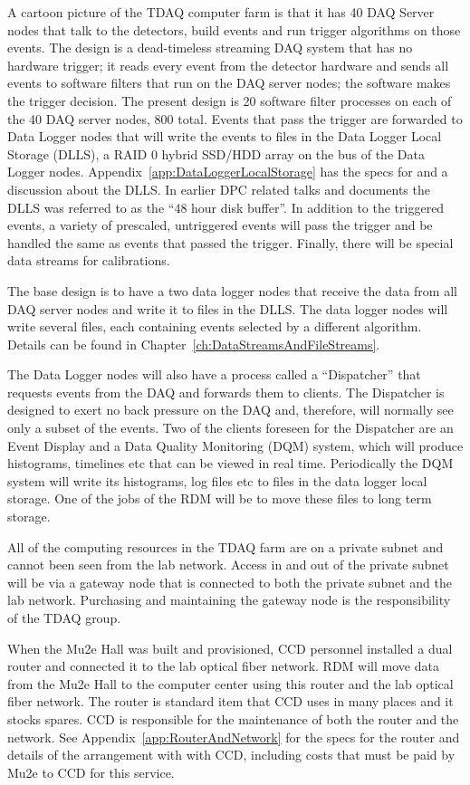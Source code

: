 A cartoon picture of the TDAQ computer farm is that it has 40 DAQ Server nodes
that talk to the detectors, build events and run trigger algorithms on those events.
The design is a dead-timeless streaming DAQ system that has no hardware trigger;
it reads every event from the detector hardware and sends all events to software filters
that run on the DAQ server nodes;
the software makes the trigger decision.
The present design is 20 software filter processes on each of the 40 DAQ server nodes, 800 total.
Events that pass the trigger are forwarded to Data Logger nodes that will write the events
to files in the Data Logger Local Storage (DLLS), a RAID 0 hybrid SSD/HDD array on the bus of the Data Logger nodes.
Appendix~\ref{app:DataLoggerLocalStorage} has the specs for and a discussion about the DLLS.
In earlier DPC related talks and documents the DLLS  was referred to as the ``48 hour disk buffer''.
In addition to the triggered events, a variety of prescaled, untriggered events will pass the
trigger and be handled the same as events that passed the trigger.
Finally, there will be special data streams for calibrations.

The base design is to have a two data logger nodes that receive the data from all DAQ server nodes
and write it to files in the DLLS.
The data logger nodes will write several files, each containing events selected by a different algorithm.
Details can be found in Chapter~\ref{ch:DataStreamsAndFileStreams}.

The Data Logger nodes will also have a process called a ``Dispatcher''
that requests events from the DAQ and forwards them to clients.
The Dispatcher is designed to exert no back pressure on the DAQ
and, therefore, will normally see only a subset of the events.
Two of the clients foreseen for the Dispatcher are an Event Display and
a Data Quality Monitoring (DQM) system,
which will produce histograms, timelines etc that can be viewed in real time.
Periodically the DQM system will write its histograms, log files etc to
files in the data logger local storage.  One of the jobs of the RDM will be
to move these files to long term storage.

All of the computing resources in the TDAQ farm are on a private subnet
and cannot been seen from the lab network.  Access in and out
of the private subnet will be via a gateway node that is connected to
both the private subnet and the lab network.
Purchasing and maintaining the gateway node is the responsibility of the TDAQ group.

When the Mu2e Hall was built and provisioned, CCD personnel installed a dual router
and connected it to the lab optical fiber network.
RDM will move data from the Mu2e Hall
to the computer center using this router and the lab optical fiber network.
The router is standard item that CCD uses in many places and it stocks spares.
CCD is responsible for the maintenance of both the router and the network.
See Appendix~\ref{app:RouterAndNetwork} for the
specs for the router and details of the arrangement with with CCD,
including costs that must be paid by Mu2e to CCD for this service.


